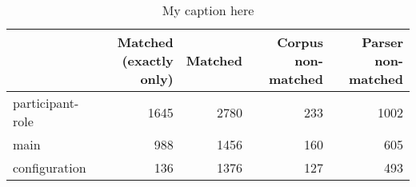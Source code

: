 \begin{table}[!ht]
\centering
\begin{tabular}{lrrrr}
\toprule
{} &  Matched (exactly only) &  Matched &  Corpus non-matched &  Parser non-matched \\
\midrule
participant-role &                    1645 &     2780 &                 233 &                1002 \\
main             &                     988 &     1456 &                 160 &                 605 \\
configuration    &                     136 &     1376 &                 127 &                 493 \\
\bottomrule
\end{tabular}
\caption{My caption here}
\label{tab:unit-elements-oe-data}
\end{table}